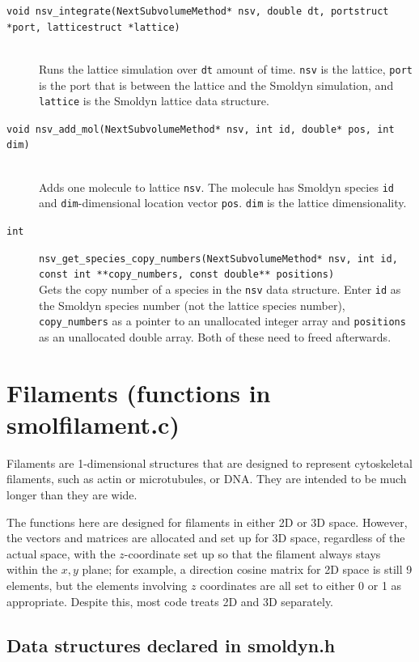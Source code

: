 \documentclass {scrbook}
\newcommand {\ttt} {\texttt}
\begin{document}
\begin{description}
\item[\ttt{void nsv\_integrate(NextSubvolumeMethod* nsv, double dt, portstruct *port, latticestruct *lattice)}]
\hfill \\
Runs the lattice simulation over \ttt{dt} amount of time. \ttt{nsv} is the lattice, \ttt{port} is the port that is between the lattice and the Smoldyn simulation, and \ttt{lattice} is the Smoldyn lattice data structure.

\item[\ttt{void nsv\_add\_mol(NextSubvolumeMethod* nsv, int id, double* pos, int dim)}]
\hfill \\
Adds one molecule to lattice \ttt{nsv}. The molecule has Smoldyn species \ttt{id} and \ttt{dim}-dimensional location vector \ttt{pos}. \ttt{dim} is the lattice dimensionality.

\item[\ttt{int}]
\ttt{nsv\_get\_species\_copy\_numbers(NextSubvolumeMethod* nsv, int id, const int **copy\_numbers, const double** positions)}
\hfill \\
Gets the copy number of a species in the \ttt{nsv} data structure. Enter \ttt{id} as the Smoldyn species number (not the lattice species number), \ttt{copy\_numbers} as a pointer to an unallocated integer array and \ttt{positions} as an unallocated double array. Both of these need to freed afterwards.

\end{description}


\section{Filaments (functions in smolfilament.c)}

Filaments are 1-dimensional structures that are designed to represent cytoskeletal filaments, such as actin or microtubules, or DNA. They are intended to be much longer than they are wide.

The functions here are designed for filaments in either 2D or 3D space. However, the vectors and matrices are allocated and set up for 3D space, regardless of the actual space, with the $z$-coordinate set up so that the filament always stays within the $x,y$ plane; for example, a direction cosine matrix for 2D space is still 9 elements, but the elements involving $z$ coordinates are all set to either 0 or 1 as appropriate. Despite this, most code treats 2D and 3D separately.

\subsection{Data structures declared in smoldyn.h}
\end{document}

